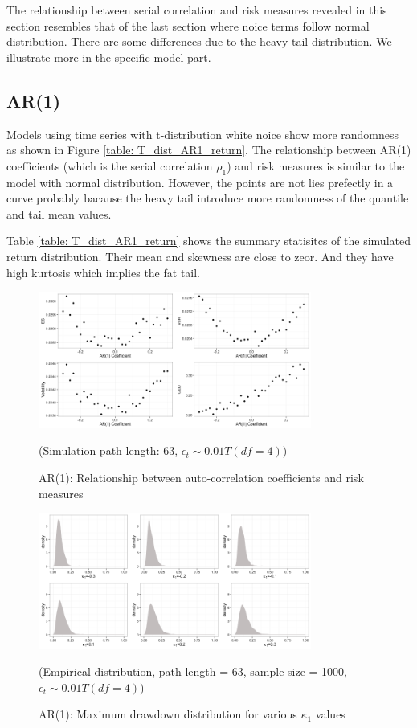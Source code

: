 \documentclass[11pt]{article}
\begin{document}
The relationship between serial correlation and risk measures revealed in this section resembles that of the last section where noice terms follow normal distribution. There are some differences due to the heavy-tail distribution. We illustrate more in the specific model part.

\subsection{AR(1)}

Models using time series with t-distribution white noice show more randomness as shown in Figure \ref{table: T_dist_AR1_return}. The relationship between AR(1) coefficients (which is the serial correlation $\rho_1$) and risk measures is similar to the model with normal distribution. However, the points are not lies prefectly in a curve probably bacause the heavy tail introduce more randomness of the quantile and tail mean values. 

Table \ref{table: T_dist_AR1_return} shows the summary statisitcs of the simulated return distribution. Their mean and skewness are close to zeor. And they have high kurtosis which implies the fat tail.

\begin{figure}[H]
\centering
\includegraphics[width = 0.8\textwidth]{../figures/simulation/T_dist_AR1_risk_measures}
\caption{AR(1): Relationship between auto-correlation coefficients and risk measures}
(Simulation path length: 63, $\epsilon_t \sim 0.01T(df = 4)$)
\label{fig:T_dist_AR1_risk_measures}
\end{figure}



\begin{figure}[H]
\centering
\includegraphics[width = 0.8\textwidth]{../figures/simulation/T_dist_AR1_maxDrawdown_dist}
\caption{AR(1): Maximum drawdown distribution for various $\kappa_1$ values }
(Empirical distribution, path length = 63, sample size = 1000, $\epsilon_t \sim 0.01T(df = 4)$)
\label{fig:T_dist_AR1_maxDrawdown_dist}
\end{figure}
\end{document}
